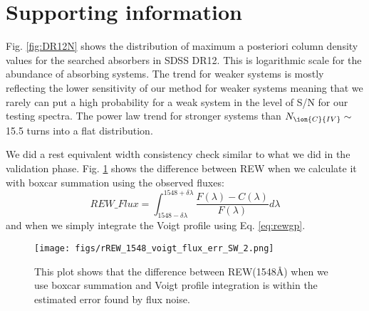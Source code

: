 \documentclass[fleqn,usenatbib]{mnras}
\newcommand{\civ}{\ion{C}{IV}}
\newcommand{\nciv}{N_{\civ}} %
\begin{document}



\bsp	%
\label{lastpage}


\appendix
\section{Supporting information }
Fig. \ref{fig:DR12N} shows the distribution of maximum a posteriori column density values
for the searched absorbers in SDSS DR12. This is logarithmic scale for the abundance of
    absorbing systems. The trend for weaker systems is mostly reflecting the lower sensitivity
    of our method for weaker systems meaning that we rarely can put a high probability for
    a weak system in the level of S/N for our testing spectra.
     The power law trend for stronger systems than $\nciv\sim$15.5 turns into a
      flat distribution.


      We did a rest equivalent width consistency check similar to what we did in the validation phase.
    Fig. \ref{fig:errDiffREW} shows the difference between REW when we calculate
    it with boxcar summation using the observed fluxes:
    \begin{equation}
      REW\_Flux = \int_{1548-\delta\lambda}^{1548+\delta\lambda} \frac{F(\lambda)-C(\lambda)}{F(\lambda)}d\lambda
      \label{eq:rew_flux}
    \end{equation}
    and when we simply integrate the Voigt profile using Eq. \ref{eq:rewgp}.

\begin{figure}
  \texttt{[image: figs/rREW\_1548\_voigt\_flux\_err\_SW\_2.png]}
  \caption{This plot shows that the difference between REW(1548\AA) when we use
  boxcar summation and Voigt profile integration
  is within the estimated error found by flux noise.}
  \label{fig:errDiffREW}
\end{figure}
\end{document}
